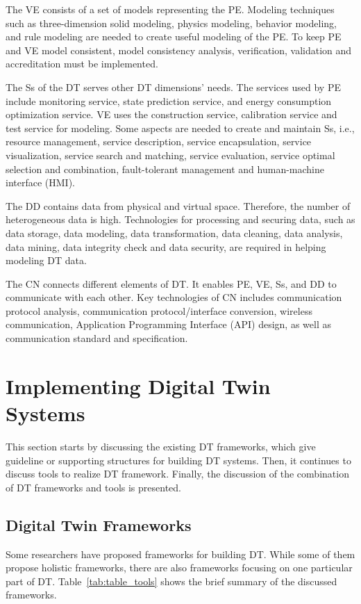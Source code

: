 \documentclass[article,table]{aaltoseries}
\begin{document}
The VE consists of a set of models representing the PE. Modeling techniques such as three-dimension solid modeling, physics modeling, behavior modeling, and rule modeling are needed to create useful modeling of the PE. To keep PE and VE model consistent, model consistency analysis, verification, validation and accreditation must be implemented.

The Ss of the DT serves other DT dimensions' needs. The services used by PE include monitoring service, state prediction service, and energy consumption optimization service. VE uses the construction service, calibration service and test service for modeling. Some aspects are needed to create and maintain Ss, i.e., resource management, service description, service encapsulation, service visualization, service search and matching, service evaluation, service optimal selection and combination, fault-tolerant management and human-machine interface (HMI).

The DD contains data from physical and virtual space. Therefore, the number of heterogeneous data is high. Technologies for processing and securing data, such as data storage, data modeling, data transformation, data cleaning, data analysis, data mining, data integrity check and data security, are required in helping modeling DT data.

The CN connects different elements of DT. It enables PE, VE, Ss, and DD to communicate with each other. Key technologies of CN includes communication protocol analysis, communication protocol/interface conversion, wireless communication, Application Programming Interface (API) design, as well as communication standard and specification.

\section{Implementing Digital Twin Systems}
This section starts by discussing the existing DT frameworks, which give guideline or supporting structures for building DT systems. Then, it continues to discuss tools to realize DT framework. Finally, the discussion of the combination of DT frameworks and tools is presented.

\subsection{Digital Twin Frameworks}
Some researchers have proposed frameworks for building DT. While some of them propose holistic frameworks, there are also frameworks focusing on one particular part of DT. Table~\ref{tab:table_tools} shows the brief summary of the discussed frameworks.
\end{document}
